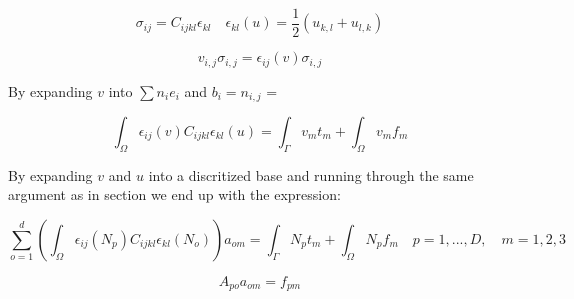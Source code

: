 \documentclass[fem.tex]{subfiles}
\begin{document}
\[ \sigma_{ij} = C_{ijkl} \epsilon_{kl} \quad  \epsilon_{kl}(u) = \frac{1}{2} \left(u_{k,l} + u_{l,k}\right)  \]

\[ v_{i,j} \sigma_{i,j} =  \epsilon_{ij}(v) \sigma_{i,j} \]

By expanding $v$ into $\sum n_i e_i$ and $b_i = n_{i,j}$  = 

\begin{equation} 
  \int_\Omega  \epsilon_{ij}(v)  C_{ijkl} \epsilon_{kl}(u)  = \int_\Gamma v_m t_m + \int_\Omega v_m f_m
    \label{eqn:weak}
\end{equation}
%

By expanding $v$ and $u$ into a discritized base and running through the same argument as in section we end up with the expression:

\begin{equation} 
\sum_{o = 1}^d \left( \int_\Omega  \epsilon_{ij}(N_p)  C_{ijkl} \epsilon_{kl}(N_o)\right) a_{om}  = \int_\Gamma N_p t_m + \int_\Omega N_p f_m
    \quad p = 1, ..., D, \quad m = 1,2,3
\end{equation}

\begin{equation} 
A_{po} a_{om} = f_{pm}
\end{equation}
\end{document}
